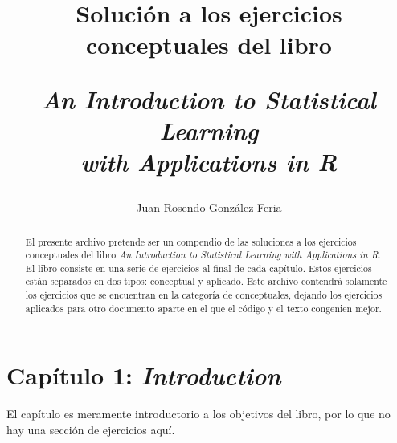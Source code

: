 \documentclass[a4paper,11pt]{article}
\title{Solución a los ejercicios conceptuales del libro
    \begin{center}
        \textit{An Introduction to Statistical Learning\\
        with Applications in R}
    \end{center}
    }
\author{Juan Rosendo González Feria}
\begin{document}
\maketitle

\begin{abstract}
    El presente archivo pretende ser un compendio de las
    soluciones a los ejercicios conceptuales del libro
    \textit{An Introduction to Statistical Learning with
    Applications in R}. El libro consiste en una serie de 
    ejercicios al final de cada capítulo. Estos ejercicios están 
    separados en dos tipos: conceptual y aplicado. Este archivo 
    contendrá solamente los ejercicios que se encuentran en la 
    categoría de conceptuales, dejando los ejercicios aplicados 
    para otro documento aparte en el que el código y el texto 
    congenien mejor.
\end{abstract}

\section{Capítulo 1: \textit{Introduction}}
    El capítulo es meramente introductorio a los objetivos del 
    libro, por lo que no hay una sección de ejercicios aquí.
\end{document}
